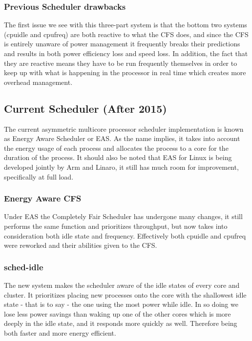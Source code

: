 \subsubsection{Previous Scheduler drawbacks}
The first issue we see with this three-part system is that the bottom two systems (cpuidle and cpufreq) are both reactive to what the CFS does, and since the CFS is entirely unaware of power management it frequently breaks their predictions and results in both power efficiency loss and speed loss. In addition, the fact that they are reactive means they have to be run frequently themselves in order to keep up with what is happening in the processor in real time which creates more overhead management. \cite{EAS2015}

\subsection{Current Scheduler (After 2015)}
The current asymmetric multicore processor scheduler implementation is known as Energy Aware Scheduler or EAS. As the name implies, it takes into account the energy usage of each process and allocates the process to a core for the duration of the process. It should also be noted that EAS for Linux is being developed jointly by Arm and Linaro, it still has much room for improvement, specifically at full load.\cite{EASp2015}

\subsubsection{Energy Aware CFS}
Under EAS the Completely Fair Scheduler has undergone many changes, it still performs the same function and prioritizes throughput, but now takes into consideration both idle state and frequency. Effectively both cpuidle and cpufreq were reworked and their abilities given to the CFS.\cite{EASp2015}

\subsubsection{sched-idle}
The new system makes the scheduler aware of the idle states of every core and cluster. It prioritizes placing new processes onto the core with the shallowest idle state - that is to say - the one using the most power while idle. In so doing we lose less power savings than waking up one of the other cores which is more deeply in the idle state, and it responds more quickly as well. Therefore being both faster and more energy efficient. \cite{EASp2015}


